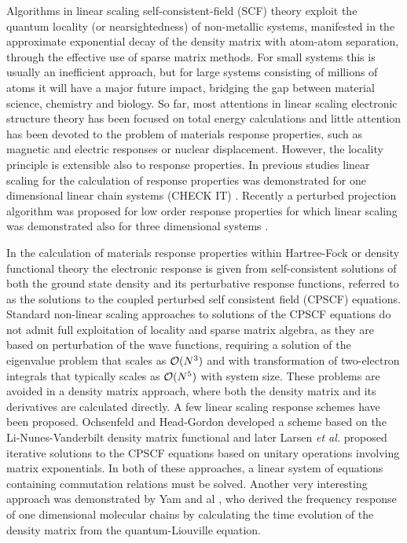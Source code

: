 \documentclass[prl,aps,twocolumn,showpacs,twocolumngrid,superbib]{revtex4}
\begin{document}
 Algorithms in linear scaling self-consistent-field (SCF) theory 
 exploit the quantum locality (or nearsightedness) of non-metallic systems, 
 manifested in the approximate exponential decay of the density matrix 
 with atom-atom separation, through the effective use of sparse 
 matrix methods. For small systems this is usually an inefficient
 approach, but for large systems consisting of millions
 of atoms it will have a major future impact, bridging the gap
 between material science, chemistry and biology. So far, most 
 attentions in linear scaling electronic structure
 theory has been focused on total energy calculations and little
 attention has been devoted to the problem of materials response
 properties, such as magnetic and electric responses or nuclear
 displacement. However, the locality principle is extensible
 also to response properties. In previous studies linear scaling 
 for the calculation of response properties was demonstrated for one
 dimensional linear chain systems (CHECK IT)
 \cite{Ochsenfeld97,COchsenfeld98,CYam03,CYam03a}. Recently
 a perturbed projection algorithm was proposed for low order
 response properties for which linear scaling was demonstrated
 also for three dimensional systems \cite{Weber04}.

 In the calculation of materials response properties within 
 Hartree-Fock or density functional theory the electronic
 response is given from self-consistent solutions of both
 the ground state density and its perturbative response functions,
 referred to as the solutions to the coupled perturbed self consistent 
 field (CPSCF) equations.
 Standard non-linear scaling approaches to solutions of the CPSCF equations 
 \cite{Pople_1979,Sekino_1986,Dupuis_1991} do not admit full exploitation 
 of locality and sparse matrix algebra, as they are based on perturbation 
 of the wave functions, requiring a solution of the eigenvalue problem
 that scales as ${\cal O}(N^3)$ and with transformation of two-electron
 integrals that typically scales as ${\cal O}(N^5)$ with system size.
 These problems are avoided in a density matrix approach, where both
 the density matrix and its derivatives are calculated directly.
 A few linear scaling response schemes have been proposed.
 Ochsenfeld and Head-Gordon developed a scheme based on the
 Li-Nunes-Vanderbilt density matrix functional \cite{Ochsenfeld_1997}
 and later Larsen {\em et al.} \cite{Helgaker_2001} proposed iterative 
 solutions to the CPSCF equations based on unitary operations
 involving matrix exponentials. In both of these approaches, a linear 
 system of equations containing commutation relations must be solved.
 Another very interesting approach was demonstrated by Yam and al
 \cite{CYam03,CYam03a}, who
 derived the frequency response of one dimensional molecular chains
 by calculating the time evolution of the density matrix from
 the quantum-Liouville equation.
\end{document}
